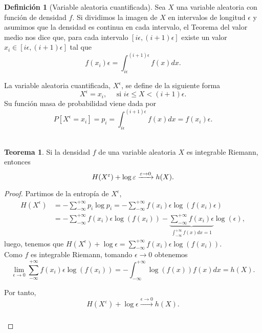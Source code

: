\documentclass[12pt,a4paper]{report} %
\theoremstyle{definition}
\newtheorem{definition}{Definición}[section]
\newtheorem{theorem}{Teorema}[section]
\begin{document}
\begin{definition}[Variable aleatoria cuantificada]
  Sea $X$ una variable aleatoria con función de densidad $f$. Si dividimos la imagen de $X$ en intervalos de longitud $\epsilon$ y asumimos que la densidad es continua en cada intervalo, el Teorema del valor medio nos dice que, para cada intervalo $\left[i\epsilon, (i+1)\epsilon\right]$ existe un valor $x_i\in \left[i\epsilon, (i+1)\epsilon\right]$ tal que \[f(x_i)\epsilon = \int_{i\epsilon}^{(i+1)\epsilon}f(x)dx.\]
  
  La variable aleatoria cuantificada, $X^{\epsilon}$, se define de la siguiente forma\[
X^{\epsilon} = x_i, \quad \text{ si } i\epsilon \leq X  < (i+1)\epsilon.
\]Su función masa de probabilidad viene dada por \[
P[X^\epsilon = x_i] = p_i =  \int_{i\epsilon}^{(i+1)\epsilon}f(x)dx = f(x_i)\epsilon.
\]\\[-10pt]
\end{definition}

\begin{theorem}
  Si la densidad $f$ de una variable aleatoria $X$ es integrable Riemann, entonces\[
H(X^{\varepsilon}) + \log \epsilon \xrightarrow[]{\epsilon \to 0}  h(X).\\
  \] 
\end{theorem}
\begin{proof}
  Partimos de la entropía de $X^{\epsilon}$,
  \begin{align*}
    H(X^{\epsilon}) &= - \sum_{-\infty}^{+\infty} p_i \log p_i = - \sum_{-\infty}^{+\infty}f(x_i)\epsilon \log\left ( f(x_i)\epsilon \right )\\
    &= -  \sum_{-\infty}^{+\infty}f(x_i)\epsilon \log\left ( f(x_i) \right ) - \underbrace{\sum_{-\infty}^{+\infty}f(x_i)\epsilon}_{\int_{-\infty}^{+\infty}f(x)dx=1} \log\left ( \epsilon \right ),
  \end{align*}
  luego, tenemos que $H(X^{\epsilon}) + \log \epsilon  = \sum_{-\infty}^{+\infty}f(x_i)\epsilon \log\left ( f(x_i) \right )$.\\

  Como $f$ es integrable Riemann, tomando $\epsilon \to 0$ obtenemos \[\lim_{\epsilon \to 0}\sum_{-\infty}^{+\infty}f(x_i)\epsilon \log\left ( f(x_i) \right )  = - \int_{-\infty}^{+\infty}\log\left( f(x)\right) f(x)dx = h(X).\]

  Por tanto,\[
H(X^{\varepsilon}) + \log \epsilon \xrightarrow[]{\epsilon \to 0}  h(X).
  \] \\[-10pt]
\end{proof}
\end{document}
